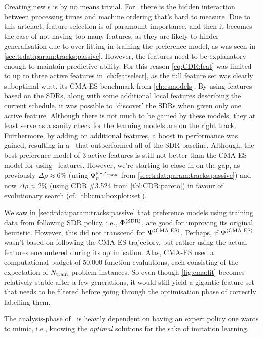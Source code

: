 Creating new \dr s is by no means trivial. For \jsp\ there is 
the hidden interaction between processing times and machine ordering that's 
hard to measure.
Due to this artefact, feature selection is of paramount importance, and then it 
becomes the case of not having too many features, as they are likely to hinder 
generalisation due to over-fitting in training the preference model, as was 
seen in \cref{sec:trdat:param:tracks:passive}. 
However, the features need to be explanatory enough to maintain predictive 
ability. 
For this reason \cref{eq:CDR:feat} was limited to up to three active features 
in \cref{ch:featselect}, as the full feature set was clearly suboptimal 
w.r.t. its CMA-ES benchmark from \cref{ch:esmodels}. 
By using features based on the SDRs, along with some additional local features 
describing the current schedule, it was possible to `discover' the SDRs when 
given only one active feature. 
Although there is not much to be gained by these models, they at least serve as 
a sanity check for the learning models are on the right track. 
Furthermore, by adding on additional features, a boost in performance was 
gained, resulting in a \cdr\ that outperformed all of the SDR baseline. 
Although, the best preference model of 3 active features is still not better 
than the CMA-ES model for  using \NrFeatLocal\ features. 
However, we're starting to close in on the gap, as previously 
$\Delta\rho\approx6\%$ (using $\Psi_p^{\text{ES}.{C_{\max}}}$ from 
\cref{sec:trdat:param:tracks:passive}) and now $\Delta\rho\approx2\%$ (using 
CDR \#3.524 from \cref{tbl:CDR:pareto}) in favour of evolutionary search (cf. 
\cref{tbl:cma:boxplot:set}).



We saw in \cref{sec:trdat:param:tracks:passive} that preference models using 
training data from following SDR policy, i.e., $\Phi^{\langle \text{SDR} \rangle}$, are good for 
improving its original heuristic. However, this did not transcend for 
$\Psi^{\langle \text{CMA-ES} \rangle}$. 
Perhaps, if $\Phi^{\langle \text{CMA-ES} \rangle}$ wasn't based on following 
the CMA-ES trajectory, but rather using the actual features encountered during 
its optimisation. Alas, CMA-ES used a computational budget of 50,000 function 
evaluations, each consisting of the expectation of $N_{\text{train}}$ problem 
instances. So even though \cref{fig:cma:fit} becomes relatively stable after a 
few generations, it would still yield a gigantic feature set that needs to be 
filtered before going through the optimisation phase of correctly labelling 
them.

The analysis-phase of \Alice\ is heavily dependent on having an expert 
policy one wants to mimic, i.e., knowing the \emph{optimal} solutions for the 
sake of imitation learning. 

